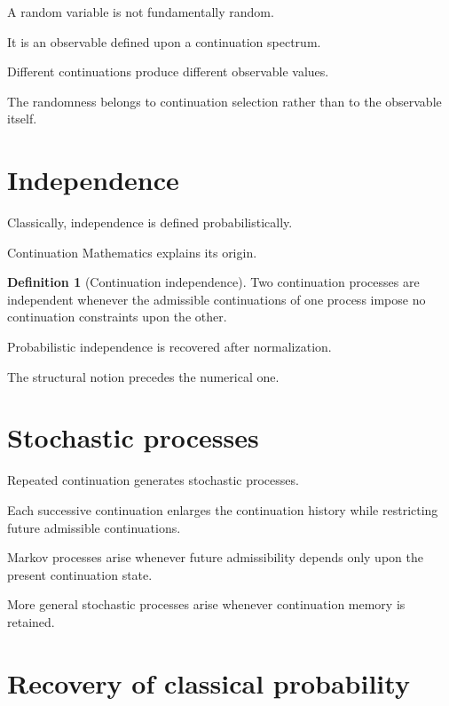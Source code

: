 \documentclass[13pt,openany]{book}
\theoremstyle{plain}
\theoremstyle{definition}
\newtheorem{definition}{Definition}[chapter]
\begin{document}
A random variable is not fundamentally random.

It is an observable defined upon a continuation spectrum.

Different continuations produce different observable values.

The randomness belongs to continuation selection rather than to the observable
itself.

\section{Independence}

Classically, independence is defined probabilistically.

Continuation Mathematics explains its origin.

\begin{definition}[Continuation independence]
Two continuation processes are independent whenever the admissible
continuations of one process impose no continuation constraints upon the
other.
\end{definition}

Probabilistic independence is recovered after normalization.

The structural notion precedes the numerical one.

\section{Stochastic processes}

Repeated continuation generates stochastic processes.

Each successive continuation enlarges the continuation history while
restricting future admissible continuations.

Markov processes arise whenever future admissibility depends only upon the
present continuation state.

More general stochastic processes arise whenever continuation memory is
retained.

\section{Recovery of classical probability}
\end{document}
